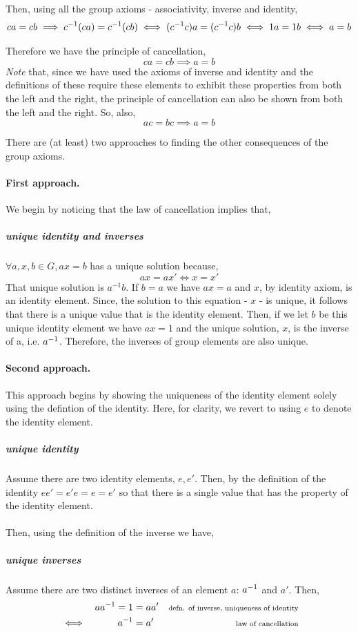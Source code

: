 \documentclass[MathsNotesBase.tex]{subfiles}
\begin{document}
{		Then, using all the group axioms - associativity, inverse and identity,
		\[ ca = cb \implies {c}^{-1}(ca) = {c}^{-1}(cb) \iff ({c}^{-1}c)a = ({c}^{-1}c)b \iff 1a = 1b \iff a = b \]
		
		Therefore we have the principle of cancellation,
		\[ ca = cb \implies a = b \]
		\textit{Note} that, since we have used the axioms of inverse and identity and the definitions of these require these elements to exhibit these properties from both the left and the right, the principle of cancellation can also be shown from both the left and the right. So, also,
		\[ ac = bc \implies a = b \]
		
		\bigskip\bigskip
		There are (at least) two approaches to finding the other consequences of the group axioms.
		\paragraph*{First approach.} We begin by noticing that the law of cancellation implies that,
		\subparagraph*{unique identity and inverses}$\forall a,x,b \in G, ax = b$ has a unique solution because,
		\[ ax = ax' \iff x = x' \]
		That unique solution is $a^{-1}b$. If $b=a$ we have $ax=a$ and $x$, by identity axiom, is an identity element. Since, the solution to this equation - $x$ - is unique, it follows that there is a unique value that is the identity element. Then, if we let $b$ be this unique identity element we have $ax=1$ and the unique solution, $x$, is the inverse of a, i.e. ${a}^{-1}$. Therefore, the inverses of group elements are also unique.
		
		\paragraph*{Second approach.} This approach begins by showing the uniqueness of the identity element solely using the defintion of the identity. Here, for clarity, we revert to using $e$ to denote the identity element.
		\subparagraph*{unique identity} Assume there are two identity elements, $e, e'$. Then, by the definition of the identity $ee' = e'e = e = e'$ so that there is a single value that has the property of the identity element.\\\\
		Then, using the definition of the inverse we have,
		\subparagraph{unique inverses} Assume there are two distinct inverses of an element $a$: ${a}^{-1}$ and $a'$. Then, 
		\begin{align*}
		&& a{a}^{-1} = 1 &= aa' &\text{\scriptsize{defn. of inverse, uniqueness of identity}}\\
		& \iff & {a}^{-1} &= a' &\text{\scriptsize{law of cancellation}}
		\end{align*}
		\bigskip\bigskip

}
\end{document}
